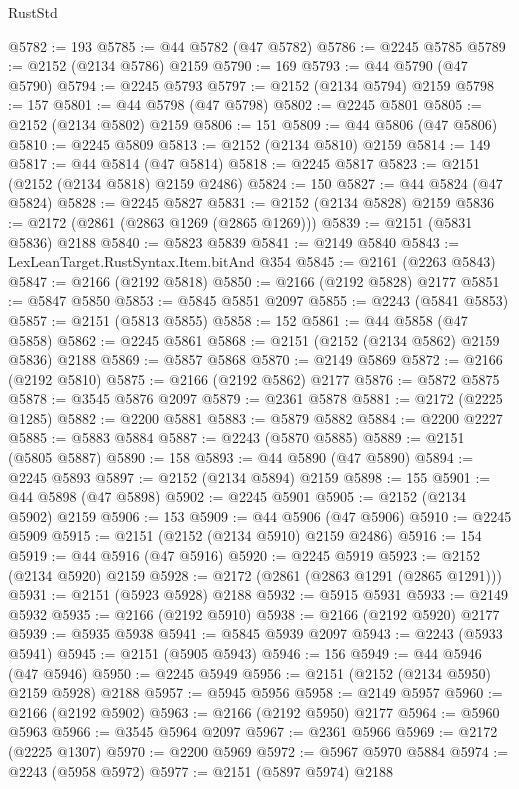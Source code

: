 \begin{lexlean}{RustStd}
\begin{coremodule}
@5782 := 193
@5785 := @44 @5782 (@47 @5782)
@5786 := @2245 @5785
@5789 := @2152 (@2134 @5786) @2159
@5790 := 169
@5793 := @44 @5790 (@47 @5790)
@5794 := @2245 @5793
@5797 := @2152 (@2134 @5794) @2159
@5798 := 157
@5801 := @44 @5798 (@47 @5798)
@5802 := @2245 @5801
@5805 := @2152 (@2134 @5802) @2159
@5806 := 151
@5809 := @44 @5806 (@47 @5806)
@5810 := @2245 @5809
@5813 := @2152 (@2134 @5810) @2159
@5814 := 149
@5817 := @44 @5814 (@47 @5814)
@5818 := @2245 @5817
@5823 := @2151 (@2152 (@2134 @5818) @2159 @2486)
@5824 := 150
@5827 := @44 @5824 (@47 @5824)
@5828 := @2245 @5827
@5831 := @2152 (@2134 @5828) @2159
@5836 := @2172 (@2861 (@2863 @1269 (@2865 @1269)))
@5839 := @2151 (@5831 @5836) @2188
@5840 := @5823 @5839
@5841 := @2149 @5840
@5843 := LexLeanTarget.RustSyntax.Item.bitAnd @354
@5845 := @2161 (@2263 @5843)
@5847 := @2166 (@2192 @5818)
@5850 := @2166 (@2192 @5828) @2177
@5851 := @5847 @5850
@5853 := @5845 @5851 @2097
@5855 := @2243 (@5841 @5853)
@5857 := @2151 (@5813 @5855)
@5858 := 152
@5861 := @44 @5858 (@47 @5858)
@5862 := @2245 @5861
@5868 := @2151 (@2152 (@2134 @5862) @2159 @5836) @2188
@5869 := @5857 @5868
@5870 := @2149 @5869
@5872 := @2166 (@2192 @5810)
@5875 := @2166 (@2192 @5862) @2177
@5876 := @5872 @5875
@5878 := @3545 @5876 @2097
@5879 := @2361 @5878
@5881 := @2172 (@2225 @1285)
@5882 := @2200 @5881
@5883 := @5879 @5882
@5884 := @2200 @2227
@5885 := @5883 @5884
@5887 := @2243 (@5870 @5885)
@5889 := @2151 (@5805 @5887)
@5890 := 158
@5893 := @44 @5890 (@47 @5890)
@5894 := @2245 @5893
@5897 := @2152 (@2134 @5894) @2159
@5898 := 155
@5901 := @44 @5898 (@47 @5898)
@5902 := @2245 @5901
@5905 := @2152 (@2134 @5902) @2159
@5906 := 153
@5909 := @44 @5906 (@47 @5906)
@5910 := @2245 @5909
@5915 := @2151 (@2152 (@2134 @5910) @2159 @2486)
@5916 := 154
@5919 := @44 @5916 (@47 @5916)
@5920 := @2245 @5919
@5923 := @2152 (@2134 @5920) @2159
@5928 := @2172 (@2861 (@2863 @1291 (@2865 @1291)))
@5931 := @2151 (@5923 @5928) @2188
@5932 := @5915 @5931
@5933 := @2149 @5932
@5935 := @2166 (@2192 @5910)
@5938 := @2166 (@2192 @5920) @2177
@5939 := @5935 @5938
@5941 := @5845 @5939 @2097
@5943 := @2243 (@5933 @5941)
@5945 := @2151 (@5905 @5943)
@5946 := 156
@5949 := @44 @5946 (@47 @5946)
@5950 := @2245 @5949
@5956 := @2151 (@2152 (@2134 @5950) @2159 @5928) @2188
@5957 := @5945 @5956
@5958 := @2149 @5957
@5960 := @2166 (@2192 @5902)
@5963 := @2166 (@2192 @5950) @2177
@5964 := @5960 @5963
@5966 := @3545 @5964 @2097
@5967 := @2361 @5966
@5969 := @2172 (@2225 @1307)
@5970 := @2200 @5969
@5972 := @5967 @5970 @5884
@5974 := @2243 (@5958 @5972)
@5977 := @2151 (@5897 @5974) @2188

\end{coremodule}
\end{lexlean}

